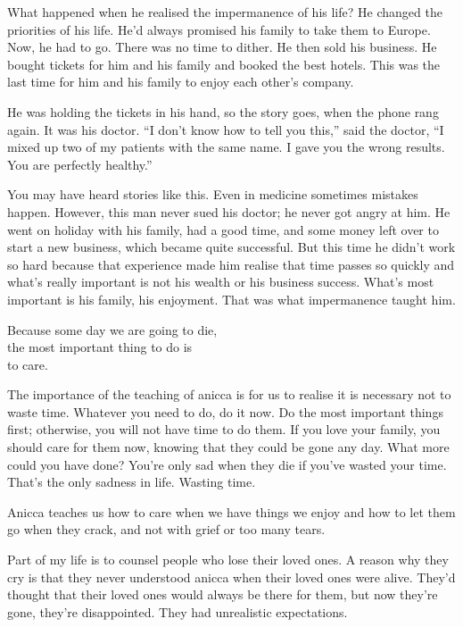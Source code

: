 \documentclass[12pt, openany]{book}
\newenvironment{aphorism}%
{%
\begin{center}\begin{itshape}
}%
{\end{itshape}\end{center}
}%
\begin{document}
What happened when he realised the impermanence of his life? He changed the priorities of his life. He’d always promised his family to take them to Europe. Now, he had to go. There was no time to dither. He then sold his business. He bought tickets for him and his family and booked the best hotels. This was the last time for him and his family to enjoy each other’s company. 

He was holding the tickets in his hand, so the story goes, when the phone rang again. It was his doctor. “I don’t know how to tell you this,” said the doctor, “I mixed up two of my patients with the same name. I gave you the wrong results. You are perfectly healthy.” 

You may have heard stories like this. Even in medicine sometimes mistakes happen. However, this man never sued his doctor; he never got angry at him. He went on holiday with his family, had a good time, and some money left over to start a new business, which became quite successful. But this time he didn’t work so hard because that experience made him realise that time passes so quickly and what’s really important is not his wealth or his business success. What’s most important is his family, his enjoyment. That was what impermanence taught him. 

\begin{aphorism}
Because some day we are going to die,\\  
the most important thing to do is\\ 
to care.
\end{aphorism}

The importance of the teaching of anicca is for us to realise it is necessary not to waste time. Whatever you need to do, do it now. Do the most important things first; otherwise, you will not have time to do them. If you love your family, you should care for them now, knowing that they could be gone any day. What more could you have done? You’re only sad when they die if you’ve wasted your time. That’s the only sadness in life. Wasting time. 

Anicca teaches us how to care when we have things we enjoy and how to let them go when they crack, and not with grief or too many tears. 

Part of my life is to counsel people who lose their loved ones. A reason why they cry is that they never understood anicca when their loved ones were alive. They’d thought that their loved ones would always be there for them, but now they’re gone, they’re disappointed. They had unrealistic expectations. 
\end{document}
